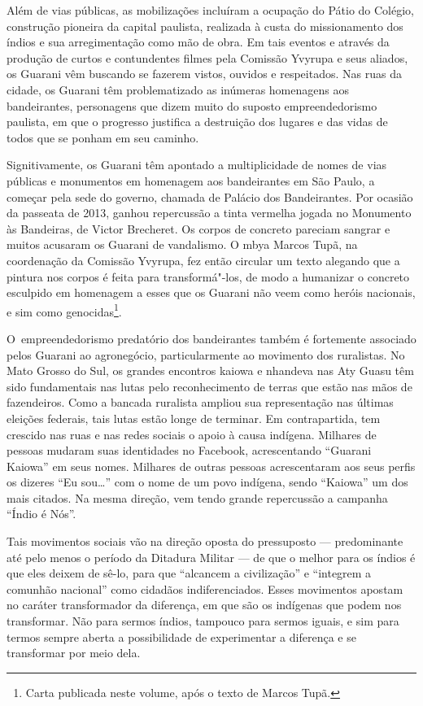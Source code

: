 Além de vias públicas, as mobilizações incluíram a ocupação do Pátio do
Colégio, construção pioneira da capital paulista, realizada à custa do
missionamento dos índios e sua arregimentação como mão de obra. Em tais
eventos e através da produção de curtos e contundentes filmes pela
Comissão Yvyrupa e seus aliados, os Guarani vêm buscando se fazerem
vistos, ouvidos e respeitados. Nas ruas da cidade, os Guarani têm
problematizado as inúmeras homenagens aos bandeirantes, personagens que
dizem muito do suposto empreendedorismo paulista, em que o progresso
justifica a destruição dos lugares e das vidas de todos que se ponham
em seu caminho.

Signitivamente, os Guarani têm apontado a multiplicidade de nomes de
vias públicas e monumentos em homenagem aos bandeirantes em São Paulo,
a começar pela sede do governo, chamada de Palácio dos Bandeirantes.
Por ocasião da passeata de 2013, ganhou repercussão a tinta vermelha
jogada no Monumento às Bandeiras, de Victor Brecheret. Os corpos de
concreto pareciam sangrar e muitos acusaram os Guarani de vandalismo. O
mbya Marcos Tupã, na coordenação da Comissão Yvyrupa, fez então
circular um texto alegando que a pintura nos corpos é feita para
transformá"-los, de modo a humanizar o concreto esculpido em homenagem a
esses que os Guarani não veem como heróis nacionais, e sim como
genocidas\footnote{Carta publicada neste volume, após o texto de
Marcos Tupã.}.

O~empreendedorismo predatório dos bandeirantes também é fortemente
associado pelos Guarani ao agronegócio, particularmente ao movimento
dos ruralistas. No Mato Grosso do Sul, os grandes encontros kaiowa e
nhandeva nas Aty Guasu têm sido fundamentais nas lutas pelo
reconhecimento de terras que estão nas mãos de fazendeiros. Como a
bancada ruralista ampliou sua representação nas últimas eleições
federais, tais lutas estão longe de terminar. Em contrapartida, tem
crescido nas ruas e nas redes sociais o apoio à causa indígena.
Milhares de pessoas mudaram suas identidades no Facebook, acrescentando
``Guarani Kaiowa'' em seus nomes. Milhares de outras pessoas
acrescentaram aos seus perfis os dizeres ``Eu sou\ldots{}'' com o nome de um
povo indígena, sendo ``Kaiowa'' um dos mais citados. Na mesma direção,
vem tendo grande repercussão a campanha ``Índio é Nós''.

Tais movimentos sociais vão na direção oposta do pressuposto ---
predominante até pelo menos o período da Ditadura Militar --- de que o
melhor para os índios é que eles deixem de sê-lo, para que ``alcancem a
civilização'' e ``integrem a comunhão nacional'' como cidadãos
indiferenciados. Esses movimentos apostam no caráter transformador da
diferença, em que são os indígenas que podem nos transformar. Não para
sermos índios, tampouco para sermos iguais, e sim para termos sempre
aberta a possibilidade de experimentar a diferença e se transformar por
meio dela.

